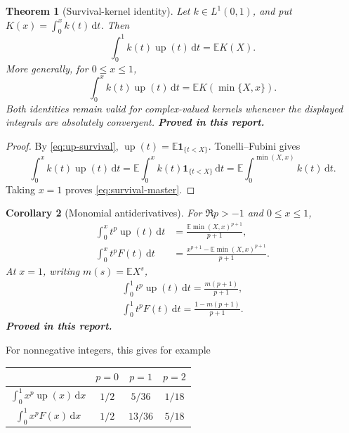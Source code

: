 \documentclass[11pt,oneside]{article}
\numberwithin{equation}{section}
\newtheorem{theorem}{Theorem}[section]
\newtheorem{corollary}[theorem]{Corollary}
\theoremstyle{definition}
\theoremstyle{remark}
\newcommand{\Up}{\operatorname{up}}
\newcommand{\dd}{\,\mathrm d}
\newcommand{\E}{\mathbb E}
\newcommand{\statusproved}{\textcolor{proofgreen}{\textbf{Proved in this report.}}}
\begin{document}
\begin{theorem}[Survival-kernel identity]
\label{thm:survival-kernel}
Let \(k\in L^1(0,1)\), and put \(K(x)=\int_0^x k(t)\dd t\).  Then
\begin{equation}
 \boxed{\int_0^1 k(t)\Up(t)\dd t=\E K(X).}
 \label{eq:survival-master}
\end{equation}
More generally, for \(0\le x\le1\),
\begin{equation}
 \boxed{\int_0^x k(t)\Up(t)\dd t
 =\E K(\min\{X,x\}).}
 \label{eq:survival-partial}
\end{equation}
Both identities remain valid for complex-valued kernels whenever the displayed
integrals are absolutely convergent.  \statusproved
\end{theorem}

\begin{proof}
By \eqref{eq:up-survival},
\(\Up(t)=\E\mathbf1_{\{t<X\}}\).  Tonelli--Fubini gives
\[
 \int_0^x k(t)\Up(t)\dd t
 =\E\int_0^x k(t)\mathbf1_{\{t<X\}}\dd t
 =\E\int_0^{\min(X,x)}k(t)\dd t.
\]
Taking \(x=1\) proves \eqref{eq:survival-master}.
\end{proof}

\begin{corollary}[Monomial antiderivatives]
\label{cor:monomial-partial}
For \(\Re p>-1\) and \(0\le x\le1\),
\begin{align}
 \int_0^x t^p\Up(t)\dd t
 &=\frac{\E\min(X,x)^{p+1}}{p+1},
 \label{eq:up-monomial-partial}\\
 \int_0^x t^pF(t)\dd t
 &=\frac{x^{p+1}-\E\min(X,x)^{p+1}}{p+1}.
 \label{eq:F-monomial-partial}
\end{align}
At \(x=1\), writing \(m(s)=\E X^s\),
\begin{align}
 \boxed{\int_0^1t^p\Up(t)\dd t=\frac{m(p+1)}{p+1},}
 \label{eq:up-monomial-full}\\
 \boxed{\int_0^1t^pF(t)\dd t=\frac{1-m(p+1)}{p+1}.}
 \label{eq:F-monomial-full}
\end{align}
\statusproved
\end{corollary}

For nonnegative integers, this gives for example
\begin{center}
\begin{tabular}{c|ccc}
\toprule
& \(p=0\) & \(p=1\) & \(p=2\)\\
\midrule
\(\int_0^1x^p\Up(x)\dd x\)
& \(1/2\) & \(5/36\) & \(1/18\)\\
\(\int_0^1x^pF(x)\dd x\)
& \(1/2\) & \(13/36\) & \(5/18\)\\
\bottomrule
\end{tabular}
\end{center}
\end{document}
